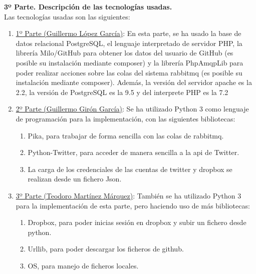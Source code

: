 \documentclass{article}
\begin{document}
\textbf{3º Parte. Descripción de las tecnologías usadas.}\\
Las tecnologías usadas son las siguientes:
\begin{enumerate}
    \item \underline{1º Parte (Guillermo López García)}: En esta parte, se ha usado
        la base de datos relacional PostgreSQL, el lenguaje interpretado de servidor
        PHP, la librería Milo/GitHub para obtener los datos del usuario de GitHub
        (es posible su instalación mediante composer) y la librería PhpAmqpLib para
        poder realizar acciones sobre las colas del sistema rabbitmq (es posible su
        instalación mediante composer). Además, la versión del servidor apache es la
        2.2, la versión de PostgreSQL es la 9.5 y del interprete PHP es la 7.2
    \item \underline{2º Parte (Guillermo Girón García)}: Se ha utilizado Python 3 como
    lenguaje de programación para la implementación, con las siguientes bibliotecas:
    \begin{enumerate}
        \item Pika, para trabajar de forma sencilla con las colas de rabbitmq.
        \item Python-Twitter, para acceder de manera sencilla a la api de Twitter.
        \item La carga de los credenciales de las cuentas de twitter y dropbox se realizan desde un fichero Json.
    \end{enumerate}
    \item \underline{3º Parte (Teodoro Martínez Márquez)}: También se ha utilizado Python 3
    para la implementación de esta parte, pero haciendo uso de más bibliotecas:
    \begin{enumerate}
	     \item Dropbox, para poder inicias sesión en dropbox y subir un fichero desde python.
       \item Urllib, para poder descargar los ficheros de github.
       \item OS, para manejo de ficheros locales.
    \end{enumerate}

\end{enumerate}
\end{document}
